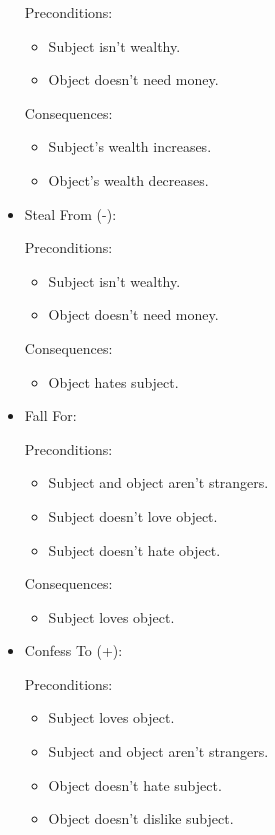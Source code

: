 \documentclass[12pt]{article}
\begin{document}
\begin{itemize}
    Preconditions:
    \begin{itemize}
      \item Subject isn't wealthy.
      \item Object doesn't need money.
    \end{itemize}

    Consequences:
    \begin{itemize}
      \item Subject's wealth increases.
      \item Object's wealth decreases.
    \end{itemize}

  \item Steal From (-):

    Preconditions:
    \begin{itemize}
      \item Subject isn't wealthy.
      \item Object doesn't need money.
    \end{itemize}

    Consequences:
    \begin{itemize}
      \item Object hates subject.
    \end{itemize}

  \item Fall For:

    Preconditions:
    \begin{itemize}
      \item Subject and object aren't strangers.
      \item Subject doesn't love object.
      \item Subject doesn't hate object.
    \end{itemize}

    Consequences:
    \begin{itemize}
      \item Subject loves object.
    \end{itemize}

  \item Confess To (+):

    Preconditions:
    \begin{itemize}
      \item Subject loves object.
      \item Subject and object aren't strangers.
      \item Object doesn't hate subject.
      \item Object doesn't dislike subject.
    \end{itemize}


\end{itemize}
\end{document}
